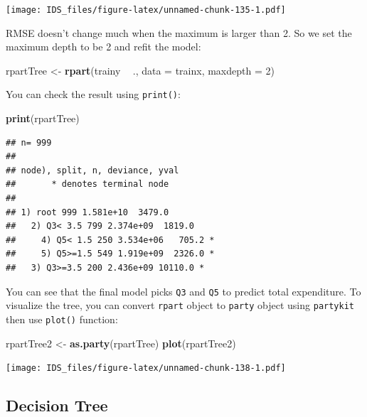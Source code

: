 \documentclass[12pt,]{krantz}
\makeatletter
\newenvironment{Shaded}{\begin{snugshade}}{\end{snugshade}}
\newcommand{\DataTypeTok}[1]{\textcolor[rgb]{0.27,0.27,0.27}{#1}}
\newcommand{\DecValTok}[1]{\textcolor[rgb]{0.06,0.06,0.06}{#1}}
\newcommand{\KeywordTok}[1]{\textcolor[rgb]{0.27,0.27,0.27}{\textbf{#1}}}
\newcommand{\NormalTok}[1]{#1}
\newcommand{\OperatorTok}[1]{\textcolor[rgb]{0.43,0.43,0.43}{\textbf{#1}}}
\newcommand{\StringTok}[1]{\textcolor[rgb]{0.5,0.5,0.5}{#1}}
\newenvironment{kframe}{%
\medskip{}
\setlength{\fboxsep}{.8em}
 \def\at@end@of@kframe{}%
 \ifinner\ifhmode%
  \def\at@end@of@kframe{\end{minipage}}%
  \begin{minipage}{\columnwidth}%
 \fi\fi%
 \def\FrameCommand##1{\hskip\@totalleftmargin \hskip-\fboxsep
 \colorbox{shadecolor}{##1}\hskip-\fboxsep
     \hskip-\linewidth \hskip-\@totalleftmargin \hskip\columnwidth}%
 \MakeFramed {\advance\hsize-\width
   \@totalleftmargin\z@ \linewidth\hsize
   \@setminipage}}%
 {\par\unskip\endMakeFramed%
 \at@end@of@kframe}
\renewenvironment{Shaded}{\begin{kframe}}{\end{kframe}}
\makeatother
\begin{document}
\texttt{[image: IDS\_files/figure-latex/unnamed-chunk-135-1.pdf]}

RMSE doesn't change much when the maximum is larger than 2. So we set the maximum depth to be 2 and refit the model:

\begin{Shaded}
\begin{Highlighting}[]
\NormalTok{rpartTree <-}\StringTok{ }\KeywordTok{rpart}\NormalTok{(trainy }\OperatorTok{~}\StringTok{ }\NormalTok{., }\DataTypeTok{data =}\NormalTok{ trainx, }\DataTypeTok{maxdepth =} \DecValTok{2}\NormalTok{)}
\end{Highlighting}
\end{Shaded}

You can check the result using \texttt{print()}:

\begin{Shaded}
\begin{Highlighting}[]
\KeywordTok{print}\NormalTok{(rpartTree)}
\end{Highlighting}
\end{Shaded}

\begin{verbatim}
## n= 999 
## 
## node), split, n, deviance, yval
##       * denotes terminal node
## 
## 1) root 999 1.581e+10  3479.0  
##   2) Q3< 3.5 799 2.374e+09  1819.0  
##     4) Q5< 1.5 250 3.534e+06   705.2 *
##     5) Q5>=1.5 549 1.919e+09  2326.0 *
##   3) Q3>=3.5 200 2.436e+09 10110.0 *
\end{verbatim}

You can see that the final model picks \texttt{Q3} and \texttt{Q5} to predict total expenditure. To visualize the tree, you can convert \texttt{rpart} object to \texttt{party} object using \texttt{partykit} then use \texttt{plot()} function:

\begin{Shaded}
\begin{Highlighting}[]
\NormalTok{rpartTree2 <-}\StringTok{ }\KeywordTok{as.party}\NormalTok{(rpartTree)}
\KeywordTok{plot}\NormalTok{(rpartTree2)}
\end{Highlighting}
\end{Shaded}

\texttt{[image: IDS\_files/figure-latex/unnamed-chunk-138-1.pdf]}

\hypertarget{decision-tree}{%
\subsection{Decision Tree}\label{decision-tree}}
\end{document}

